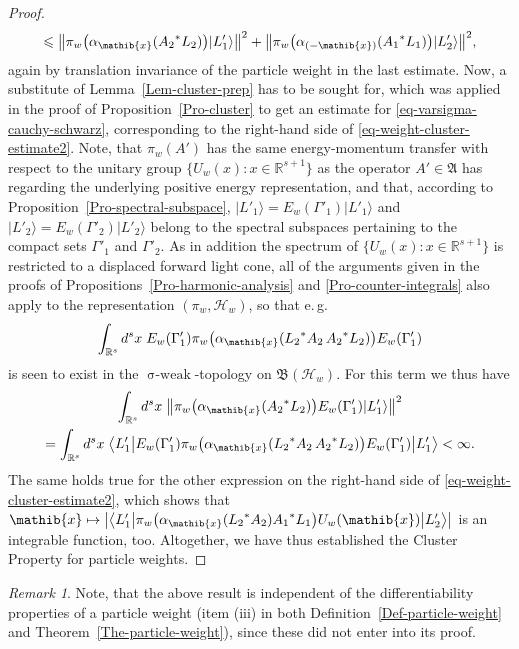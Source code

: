 \documentclass[11pt,twoside,openright]{report}
\theoremstyle{definition}
\theoremstyle{plain}
\theoremstyle{remark}
\newtheorem*{Rem}{Remark}
\theoremstyle{assumption}
\DeclareMathOperator{\sw}{\sigma-weak}
\newcommand{\set}[1]{\{ #1 \}}
\newcommand{\babs}[1]{\bigl\lvert #1 \bigr\rvert}
\newcommand{\bnorm}[1]{\bigl\lVert #1 \bigr\rVert}
\newcommand{\ket}[1]{\vert #1 \rangle}
\newcommand{\bscpx}[3]{\bigl\langle #1 \big\vert #2 \big\vert #3
  \bigr\rangle}
\newcommand{\Afrak}{\mathfrak{A}}
\newcommand{\xib}{\mathib{x}}
\newcommand{\Hscr}{\mathscr{H}}
\newcommand{\Rs}{\mathbb{R}^s}
\newcommand{\Rsone}{\mathbb{R}^{s + 1}}
\newcommand{\BHw}{\mathfrak{B} ( \mathscr{H}_w )}
\newcommand{\aibx}{\alpha_\mathib{x}}
\newcommand{\aminusibx}{\alpha_{(-\mathib{x})}}
\begin{document}
\begin{proof}
\begin{multline}
    \leqslant \bnorm{\pi_w \bigl( \aibx ( {A_2}^* L_2 ) \bigr)
    \ket{L'_1}}^2 + \bnorm{\pi_w \bigl( \aminusibx ( {A_1}^* L_1 )
    \bigr) \ket{L'_2}}^2 \text{,}
  \end{multline}
  again by translation invariance of the particle weight in the last
  estimate. Now, a substitute of Lemma~\ref{Lem-cluster-prep} has to
  be sought for, which was applied in the proof of
  Proposition~\ref{Pro-cluster} to get an estimate for
  \eqref{eq-varsigma-cauchy-schwarz}, corresponding to the right-hand
  side of \eqref{eq-weight-cluster-estimate2}. Note, that $\pi_w ( A'
  )$ has the same energy-momentum transfer with respect to the unitary
  group $\set{U_w ( x ) : x \in \Rsone}$ as the operator $A' \in
  \Afrak$ has regarding the underlying positive energy representation,
  and that, according to Proposition~\ref{Pro-spectral-subspace},
  $\ket{L'_1} = E_w ( \Gamma'_1 ) \ket{L'_1}$ and $\ket{L'_2} =
  E_w ( \Gamma'_2 ) \ket{L'_2}$ belong to the spectral subspaces
  pertaining to the compact sets $\Gamma'_1$ and
  $\Gamma'_2$. As in addition the spectrum of $\set{U_w ( x ) : x \in
  \Rsone}$ is restricted to a displaced forward light cone, all of the
  arguments given in the proofs of
  Propositions~\ref{Pro-harmonic-analysis} and
  \ref{Pro-counter-integrals} also apply to the representation $(\pi_w
  , \Hscr_w )$, so that e.\,g.
  \begin{equation*}
    \int_{\Rs} d^s x \; E_w ( \Gamma'_1 ) \pi_w \bigl( \aibx ( {L_2}^*
    A_2 \, {A_2}^* L_2 ) \bigr) E_w ( \Gamma'_1 )
  \end{equation*}
  is seen to exist in the $\sw$-topology on $\BHw$. For this term we
  thus have
  \begin{multline}
    \label{eq-weight-cluster-estimate3}
    \int_{\Rs} d^s x \; \bnorm{\pi_w \bigl( \aibx ( {A_2}^* L_2 )
    \bigr) E_w ( \Gamma'_1 ) \ket{L'_1}}^2 \\
    = \int_{\Rs} d^s x \; \bscpx{L'_1}{E_w ( \Gamma'_1 ) \pi_w \bigl(
    \aibx ( {L_2}^* A_2 \, {A_2}^* L_2 ) \bigr)
    E_w ( \Gamma'_1 )}{L'_1} < \infty \text{.}
  \end{multline}
  The same holds true for the other expression on the right-hand side
  of \eqref{eq-weight-cluster-estimate2}, which shows that $\xib
  \mapsto \babs{\bscpx{L'_1}{\pi_w \bigl( \aibx ( {L_2}^* A_2 )
  {A_1}^* L_1 \bigr) U_w ( \xib )}{L'_2}}$ is an integrable function,
  too. Altogether, we have thus established the Cluster Property for
  particle weights.
\end{proof}
\begin{Rem}
  Note, that the above result is independent of the differentiability
  properties of a particle weight (item (iii) in both
  Definition~\ref{Def-particle-weight} and
  Theorem~\ref{The-particle-weight}), since these did not enter into
  its proof.
\end{Rem}
\end{document}
